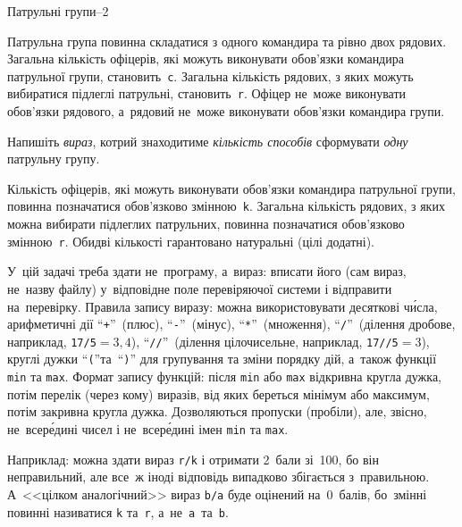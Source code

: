 {

\PrintEjudgeConstraintsfalse

\begin{problemAllDefault}{Патрульні групи--2}

Патрульна група повинна складатися з одного командира та рівно двох рядових. Загальна кількість офіцерів, які можуть виконувати обов'язки командира патрульної групи, становить~\texttt{c}. Загальна кількість рядових, з яких можуть вибиратися підлеглі патрульні, становить~\texttt{r}. Офіцер не~може виконувати обов'язки рядового, а~рядовий не~може виконувати обов'язки командира групи.

Напишіть \emph{вираз}, котрий знаходитиме \emph{кількість способів} сформувати \emph{одну} патрульну групу.

Кількість офіцерів, які можуть виконувати обов'язки командира патрульної групи, повинна позначатися обов'язково змінною~\texttt{k}.
Загальна кількість рядових, з яких можна вибирати підлеглих патрульних, повинна позначатися обов'язково змінною~\texttt{r}.
Обидві кількості гарантовано натуральні (цілі додатні).

У~цій задачі треба здати не~програму, а~вираз: 
вписати його (сам вираз, не~назву файлу) у~відповідне поле перевіряючої системи
і відправити на~перевірку. Правила запису виразу:
можна використовувати десяткові ч\'{и}сла, арифметичні дії ``\verb"+"''~(плюс), 
``\verb"-"''~(мінус), ``\verb"*"''~(множення), ``\verb"/"''~(ділення дробове, наприклад, \verb"17/5"${=}3{,}4$), ``\verb"//"''~(ділення цілочисельне, наприклад, \verb"17//5"${=}3$), круглі дужки ``\verb"("''\nolinebreak[2] та~``\verb")"'' 
для групування та зміни порядку дій, а~також функції \verb"min" та \verb"max".
Формат запису функцій: після \verb"min" або \verb"max" відкривна кругла дужка, потім перелік (через кому) виразів, від яких береться мінімум або максимум, потім закривна кругла дужка.
 Дозволяються пропуски (пробіли), 
але, звісно, не~всер\'{е}дині чисел і не~всер\'{е}дині імен \verb"min" та \verb"max".

Наприклад: можна здати вираз 
\verb"r/k"
і отримати 2~бали зі~100, бо він неправильний, 
але все~ж іноді відповідь випадково збігається з~правильною. 
А~<<цілком аналогічний>> вираз 
\verb"b/a"
буде оцінений на~0~балів, 
бо~змінні повинні називатися \verb"k" та~\verb"r", а~не~\verb"a"~та~\verb"b".


\end{problemAllDefault}}
